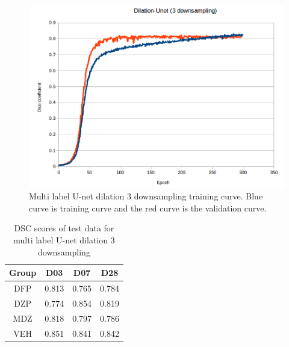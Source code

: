 \begin{figure}[!tbh]
\centering
\includegraphics[width=\textwidth]{results/train_results_multi_unetdil3.png}
\caption{Multi label U-net dilation 3 downsampling training curve. Blue curve is training curve and the red curve is the validation curve. }
\label{fig:results_multi_unetdil3_train}
\end{figure}

\begin{table}[tbh]
\renewcommand{\arraystretch}{1}
\centering
\begin{tabular}{|c|c|c|c|}
\hline
\textbf{Group} & \textbf{D03}& \textbf{D07}& \textbf{D28}\\
\hline
DFP & 0.813 & 0.765 & 0.784\\      
\hline
DZP & 0.774 & 0.854 & 0.819\\
\hline
MDZ & 0.818 & 0.797 & 0.786\\ 
\hline
VEH & 0.851 & 0.841 & 0.842\\ 
\hline
\end{tabular}
\caption{DSC scores of test data for multi label U-net dilation 3 downsampling}
\label{tab.multi_model_results_unetdil3}
\end{table}


